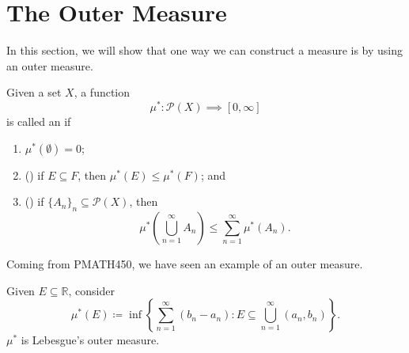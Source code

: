 \documentclass[notoc,notitlepage]{tufte-book}
\begin{document}

\section{The Outer Measure}%
\label{sec:the_outer_measure}

In this section, we will show that one way we can construct a measure
is by using an outer measure.

\begin{defn}\label{defn:outer_measure}
  Given a set $X$, a function
  \begin{equation*}
    \mu^* : \mathcal{P}(X) \implies [0, \infty]
  \end{equation*}
  is called an  if
  \begin{enumerate}
    \item $\mu^*(\emptyset) = 0$; 
    \item () if $E \subseteq F$, then
      $\mu^*(E) \leq \mu^*(F)$; and
    \item ()
      if $\{ A_n \}_{n} \subseteq \mathcal{P}(X)$, then
      \begin{equation*}
        \mu^* \left( \bigcup_{n=1}^{\infty} A_n \right)
          \leq \sum_{n=1}^{\infty} \mu^*(A_n).
      \end{equation*}
  \end{enumerate}
\end{defn}

Coming from PMATH450, we have seen an example of an outer measure.

\begin{propo}\label{propo:lebesgue_s_outer_measure}
  Given $E \subseteq \mathbb{R}$, consider
  \begin{equation*}
    \mu^*(E) \coloneqq \inf \left\{ 
      \sum_{n=1}^{\infty} (b_n - a_n)
        : E \subseteq \bigcup_{n=1}^{\infty} (a_n, b_n)
    \right\}.
  \end{equation*}
  $\mu^*$ is Lebesgue's outer measure.
\end{propo}
\end{document}
